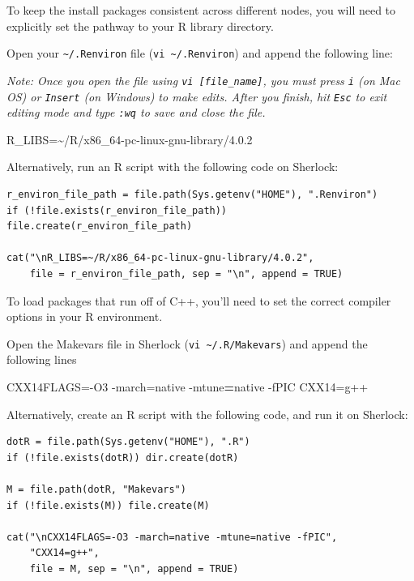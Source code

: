 \documentclass[
]{book}
\newenvironment{Shaded}{\begin{snugshade}}{\end{snugshade}}
\newcommand{\AttributeTok}[1]{\textcolor[rgb]{0.77,0.63,0.00}{#1}}
\newcommand{\ExtensionTok}[1]{#1}
\newcommand{\NormalTok}[1]{#1}
\newcommand{\OperatorTok}[1]{\textcolor[rgb]{0.81,0.36,0.00}{\textbf{#1}}}
\newcommand{\VariableTok}[1]{\textcolor[rgb]{0.00,0.00,0.00}{#1}}
\begin{document}
To keep the install packages consistent across different nodes, you will need to explicitly set the pathway to your R library directory.

Open your \texttt{\textasciitilde{}/.Renviron} file (\texttt{vi\ \textasciitilde{}/.Renviron}) and append the following line:

\emph{Note: Once you open the file using \texttt{vi\ {[}file\_name{]}}, you must press \texttt{i} (on Mac OS) or \texttt{Insert} (on Windows) to make edits. After you finish, hit \texttt{Esc} to exit editing mode and type \texttt{:wq} to save and close the file.}

\begin{Shaded}
\begin{Highlighting}[]
\VariableTok{R\_LIBS=}\NormalTok{\textasciitilde{}/R/x86\_64{-}pc{-}linux{-}gnu{-}library/4.0.2}
\end{Highlighting}
\end{Shaded}

Alternatively, run an R script with the following code on Sherlock:

\begin{verbatim}
r_environ_file_path = file.path(Sys.getenv("HOME"), ".Renviron")
if (!file.exists(r_environ_file_path)) file.create(r_environ_file_path)

cat("\nR_LIBS=~/R/x86_64-pc-linux-gnu-library/4.0.2",
    file = r_environ_file_path, sep = "\n", append = TRUE)
\end{verbatim}

To load packages that run off of C++, you'll need to set the correct compiler options in your R environment.

Open the Makevars file in Sherlock (\texttt{vi\ \textasciitilde{}/.R/Makevars}) and append the following lines

\begin{Shaded}
\begin{Highlighting}[]
\VariableTok{CXX14FLAGS=}\NormalTok{{-}O3 }\ExtensionTok{{-}march=native} \AttributeTok{{-}mtune}\OperatorTok{=}\NormalTok{native }\AttributeTok{{-}fPIC}
\VariableTok{CXX14=}\NormalTok{g++}
\end{Highlighting}
\end{Shaded}

Alternatively, create an R script with the following code, and run it on Sherlock:

\begin{verbatim}
dotR = file.path(Sys.getenv("HOME"), ".R")
if (!file.exists(dotR)) dir.create(dotR)

M = file.path(dotR, "Makevars")
if (!file.exists(M)) file.create(M)

cat("\nCXX14FLAGS=-O3 -march=native -mtune=native -fPIC",
    "CXX14=g++",
    file = M, sep = "\n", append = TRUE)
\end{verbatim}
\end{document}

